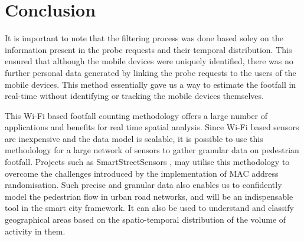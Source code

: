 \documentclass[11t, a4paper, twocolumn]{article}
\begin{document}
	\section{Conclusion}
		It is important to note that the filtering process was done based soley on the information present in the probe requests and their temporal distribution.
		This ensured that although the mobile devices were uniquely identified, there was no further personal data generated by linking the probe requests to the users of the mobile devices.
		This method essentially gave us a way to estimate the footfall in real-time without identifying or tracking the mobile devices themselves.

		This Wi-Fi based footfall counting methodology offers a large number of applications and benefits for real time spatial analysis.
		Since Wi-Fi based sensors are inexpensive and the data model is scalable, it is possible to use this methodology for a large network of sensors to gather granular data on pedestrian footfall.
		Projects such as SmartStreetSensors \citep{sss2016}, may utilise this methodology to overcome the challenges introduced by the implementation of MAC address randomisation.
		Such precise and granular data also enables us to confidently model the pedestrian flow in urban road networks, and will be an indispensable tool in the smart city framework.
		It can also be used to understand and classify geographical areas based on the spatio-temporal distribution of the volume of activity in them.

	\printbibliography[title={References}]
\end{document}
